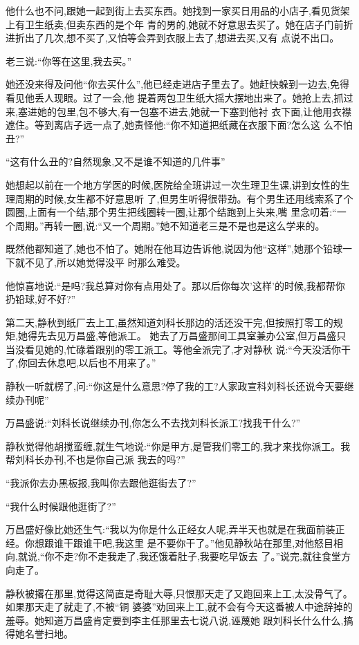 ﻿\documentclass[12pt]{article}
\begin{document}
他什么也不问,跟她一起到街上去买东西。她找到一家买日用品的小店子,看见货架上有卫生纸卖,但卖东西的是个年
青的男的,她就不好意思去买了。她在店子门前折进折出了几次,想不买了,又怕等会弄到衣服上去了,想进去买,又有
点说不出口。

老三说:``你等在这里,我去买。''

她还没来得及问他``你去买什么'',他已经走进店子里去了。她赶快躲到一边去,免得看见他丢人现眼。过了一会,他
提着两包卫生纸大摇大摆地出来了。她抢上去,抓过来,塞进她的包里,包不够大,有一包塞不进去,她就一下塞到他衬
衣下面,让他用衣襟遮住。等到离店子远一点了,她责怪他:``你\myrule 不知道把纸藏在衣服下面?怎么\myrule 这
么不怕丑?''

``这有什么丑的?自然现象,又不是谁不知道的几件事\myrule ''

她想起以前在一个地方学医的时候,医院给全班讲过一次生理卫生课,讲到女性的生理周期的时候,女生都不好意思听
了,但男生听得很带劲。有个男生还用线索系了个圆圈,上面有一个结,那个男生把线圈转一圈,让那个结跑到上头来,嘴
里念叨着:``一个周期。''再转一圈,说:``又一个周期。''她不知道老三是不是也是这么学来的。

既然他都知道了,她也不怕了。她附在他耳边告诉他,说因为他``这样'',她那个铅球一下就不见了,所以她觉得没平
时那么难受。

他惊喜地说:``是吗?我总算对你有点用处了。那以后你每次'这样'的时候,我都帮你扔铅球,好不好?''

第二天,静秋到纸厂去上工,虽然知道刘科长那边的活还没干完,但按照打零工的规矩,她得先去见万昌盛,等他派工。
她去了万昌盛那间工具室兼办公室,但万昌盛只当没看见她的,忙碌着跟别的零工派工。等他全派完了,才对静秋
说:``今天没活你干了,你\myrule 回去休息吧,以后也\myrule 不用来了。''

静秋一听就楞了,问:``你这是什么意思?停了我的工?人家政宣科刘科长还说今天要继续办刊呢\myrule ''

万昌盛说:``刘科长说继续办刊,你怎么不去找刘科长派工?找我干什么?''

静秋觉得他胡搅蛮缠,就生气地说:``你是甲方,是管我们零工的,我才来找你派工。我帮刘科长办刊,不也是你自己派
我去的吗?''

``我派你去办黑板报,我叫你去跟他逛街去了?''

``我什么时候跟他逛街了?''

万昌盛好像比她还生气:``我以为你是什么正经女人呢,弄半天也就是在我面前装正经。你想跟谁干跟谁干吧,我这里
是不要你干了。''他见静秋站在那里,对他怒目相向,就说,``你不走?你不走我走了,我还饿着肚子,我要吃早饭去
了。''说完,就往食堂方向走了。

静秋被撂在那里,觉得这简直是奇耻大辱,只恨那天走了又跑回来上工,太没骨气了。如果那天走了就走了,不被``铜
婆婆''劝回来上工,就不会有今天这番被人中途辞掉的羞辱。她知道万昌盛肯定要到李主任那里去七说八说,诬蔑她
跟刘科长什么什么,搞得她名誉扫地。
\end{document}
